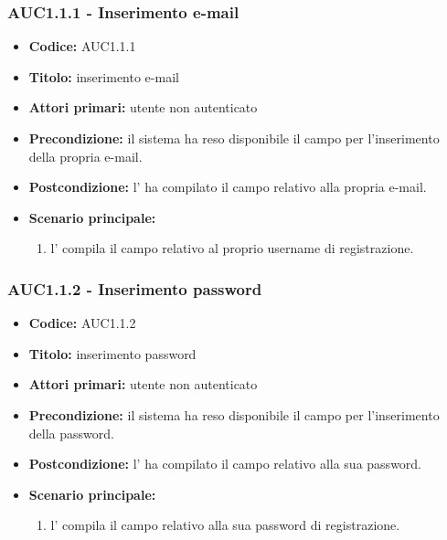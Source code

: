 \documentclass[casi-duso]{subfiles}
\begin{document}
\subsubsection{AUC1.1.1 - Inserimento e-mail}
\label{subsub:AUC1.1.1}
\begin{itemize}
  \item \textbf{Codice:} AUC1.1.1
  \item \textbf{Titolo:} inserimento e-mail
  \item \textbf{Attori primari:} utente non autenticato
  \item \textbf{Precondizione:} il sistema ha reso disponibile il campo per l'inserimento della propria e-mail.
  \item \textbf{Postcondizione:} l' ha compilato il campo relativo alla propria e-mail.
  \item \textbf{Scenario principale:} 
  \begin{enumerate}
    \item l' compila il campo relativo al proprio username di registrazione.  
  \end{enumerate}
\end{itemize}

\subsubsection{AUC1.1.2 - Inserimento password}
\label{subsub:AUC1.1.2}
\begin{itemize}
  \item \textbf{Codice:} AUC1.1.2
  \item \textbf{Titolo:} inserimento password
  \item \textbf{Attori primari:} utente non autenticato
  \item \textbf{Precondizione:} il sistema ha reso disponibile il campo per l'inserimento della password.
  \item \textbf{Postcondizione:} l' ha compilato il campo relativo alla sua password.
  \item \textbf{Scenario principale:} 
  \begin{enumerate}
    \item l' compila il campo relativo alla sua password di registrazione.
  \end{enumerate}
\end{itemize}
\end{document}
